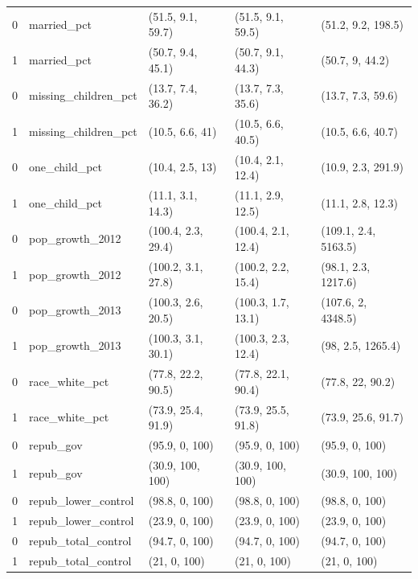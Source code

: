 \documentclass[aoas]{imsart}
\theoremstyle{plain}
\theoremstyle{remark}
\begin{document}
\begin{appendix}
\begin{table}[ht]
\begin{tabular}{rllll}
  0 & married\_pct & (51.5, 9.1, 59.7) & (51.5, 9.1, 59.5) & (51.2, 9.2, 198.5) \\ 
  1 & married\_pct & (50.7, 9.4, 45.1) & (50.7, 9.1, 44.3) & (50.7, 9, 44.2) \\ 
  0 & missing\_children\_pct & (13.7, 7.4, 36.2) & (13.7, 7.3, 35.6) & (13.7, 7.3, 59.6) \\ 
  1 & missing\_children\_pct & (10.5, 6.6, 41) & (10.5, 6.6, 40.5) & (10.5, 6.6, 40.7) \\ 
  0 & one\_child\_pct & (10.4, 2.5, 13) & (10.4, 2.1, 12.4) & (10.9, 2.3, 291.9) \\ 
  1 & one\_child\_pct & (11.1, 3.1, 14.3) & (11.1, 2.9, 12.5) & (11.1, 2.8, 12.3) \\ 
  0 & pop\_growth\_2012 & (100.4, 2.3, 29.4) & (100.4, 2.1, 12.4) & (109.1, 2.4, 5163.5) \\ 
  1 & pop\_growth\_2012 & (100.2, 3.1, 27.8) & (100.2, 2.2, 15.4) & (98.1, 2.3, 1217.6) \\ 
  0 & pop\_growth\_2013 & (100.3, 2.6, 20.5) & (100.3, 1.7, 13.1) & (107.6, 2, 4348.5) \\ 
  1 & pop\_growth\_2013 & (100.3, 3.1, 30.1) & (100.3, 2.3, 12.4) & (98, 2.5, 1265.4) \\ 
  0 & race\_white\_pct & (77.8, 22.2, 90.5) & (77.8, 22.1, 90.4) & (77.8, 22, 90.2) \\ 
  1 & race\_white\_pct & (73.9, 25.4, 91.9) & (73.9, 25.5, 91.8) & (73.9, 25.6, 91.7) \\ 
  0 & repub\_gov & (95.9, 0, 100) & (95.9, 0, 100) & (95.9, 0, 100) \\ 
  1 & repub\_gov & (30.9, 100, 100) & (30.9, 100, 100) & (30.9, 100, 100) \\ 
  0 & repub\_lower\_control & (98.8, 0, 100) & (98.8, 0, 100) & (98.8, 0, 100) \\ 
  1 & repub\_lower\_control & (23.9, 0, 100) & (23.9, 0, 100) & (23.9, 0, 100) \\ 
  0 & repub\_total\_control & (94.7, 0, 100) & (94.7, 0, 100) & (94.7, 0, 100) \\ 
  1 & repub\_total\_control & (21, 0, 100) & (21, 0, 100) & (21, 0, 100) \\
   \hline
\end{tabular}
\end{table}


\end{appendix}
\end{document}
